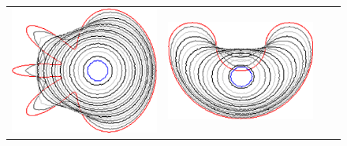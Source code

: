 \begin{figure}
\begin{tabular}{p{3em}ccc}
\includegraphics[scale=0.25]{figures/chapter6/level-effect/flower/improve/len_pen0/radius-9/level5/summary.pdf} &
\includegraphics[scale=0.25]{figures/chapter6/level-effect/bean/improve/len_pen0/radius-9/level5/summary.pdf} \\[2em]

\end{tabular}
\end{figure}

